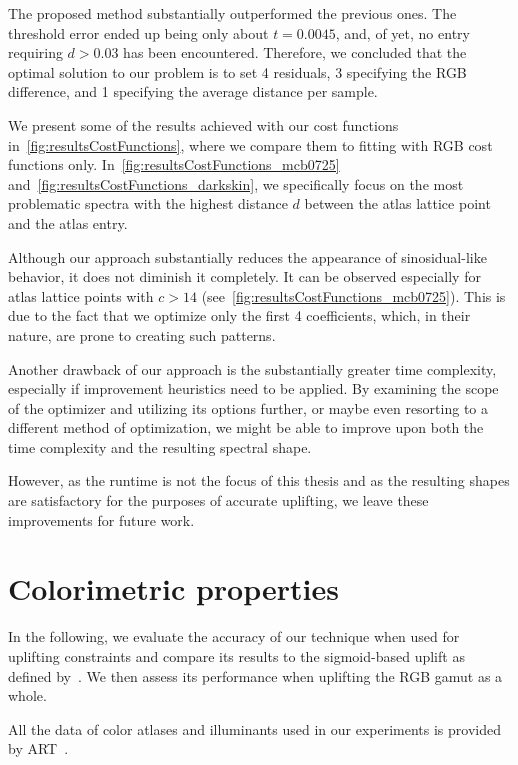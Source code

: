 The proposed method substantially outperformed the previous ones. The threshold error ended up being only about $t = 0.0045$, and, of yet, no entry requiring $d > 0.03$ has been encountered. Therefore, we concluded that the optimal solution to our problem is to set 4 residuals, 3 specifying the RGB difference, and 1 specifying the average distance per sample.

We present some of the results achieved with our cost functions in~\cref{fig:resultsCostFunctions}, where we compare them to fitting with RGB cost functions only. In~\cref{fig:resultsCostFunctions_mcb0725} and~\cref{fig:resultsCostFunctions_darkskin}, we specifically focus on the most problematic spectra with the highest distance $d$ between the atlas lattice point and the atlas entry.

Although our approach substantially reduces the appearance of sinosidual-like behavior, it does not diminish it completely. It can be observed especially for atlas lattice points with $c > 14$ (see~\cref{fig:resultsCostFunctions_mcb0725}). This is due to the fact that we optimize only the first 4 coefficients, which, in their nature, are prone to creating such patterns.

Another drawback of our approach is the substantially greater time complexity, especially if improvement heuristics need to be applied. By examining the scope of the optimizer and utilizing its options further, or maybe even resorting to a different method of optimization, we might be able to improve upon both the time complexity and the resulting spectral shape.

However, as the runtime is not the focus of this thesis and as the resulting shapes are satisfactory for the purposes of accurate uplifting, we leave these improvements for future work.

\section{Colorimetric properties}

In the following, we evaluate the accuracy of our technique when used for uplifting constraints and compare its results to the sigmoid-based uplift as defined by~\citet{upsamplingJakobHanika}. We then assess its performance when uplifting the RGB gamut as a whole.

All the data of color atlases and illuminants used in our experiments is provided by ART~\cite{ART}.

